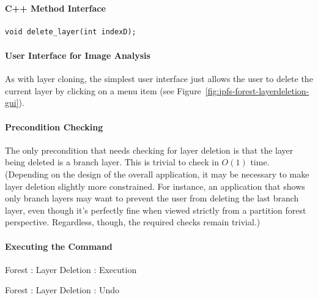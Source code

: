 \paragraph{C++ Method Interface}

\begin{lstlisting}[style=Prototype]
void delete_layer(int indexD);
\end{lstlisting}

\paragraph{User Interface for Image Analysis}

As with layer cloning, the simplest user interface just allows the user to delete the current layer by clicking on a menu item (see Figure~\ref{fig:ipfs-forest-layerdeletion-gui}).


\paragraph{Precondition Checking}

The only precondition that needs checking for layer deletion is that the layer being deleted is a branch layer. This is trivial to check in $O(1)$ time. (Depending on the design of the overall application, it may be necessary to make layer deletion slightly more constrained. For instance, an application that shows only branch layers may want to prevent the user from deleting the last branch layer, even though it's perfectly fine when viewed strictly from a partition forest perspective. Regardless, though, the required checks remain trivial.)

\paragraph{Executing the Command}

\begin{stulisting}[p]
\caption{Forest : Layer Deletion : Execution}
\label{code:ipfs-forest-deletelayerimpl}

\end{stulisting}

\begin{stulisting}[p]
\caption{Forest : Layer Deletion : Undo}
\label{code:ipfs-forest-undeletelayerimpl}

\end{stulisting}

